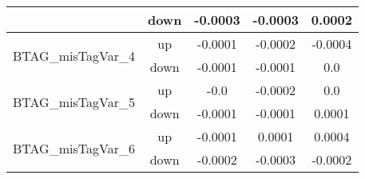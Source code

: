 \begin{table}[h!]
\begin{tabular}{lcccc}
                                       & down &     -0.0003     &     -0.0003     &     0.0002       \\ \hline
\multirow{2}{*}{BTAG\_misTagVar\_4}      & up   &     -0.0001     &     -0.0002     &     -0.0004      \\
                                       & down &     -0.0001     &     -0.0001     &     0.0       \\ \hline
\multirow{2}{*}{BTAG\_misTagVar\_5}      & up   &     -0.0     &     -0.0002     &     0.0      \\
                                       & down &     -0.0001     &     -0.0001     &     0.0001       \\ \hline
\multirow{2}{*}{BTAG\_misTagVar\_6}      & up   &     -0.0001     &     0.0001     &     0.0004      \\
                                       & down &     -0.0002     &     -0.0003     &     -0.0002       \\ \hline


\end{tabular}
\end{table}


